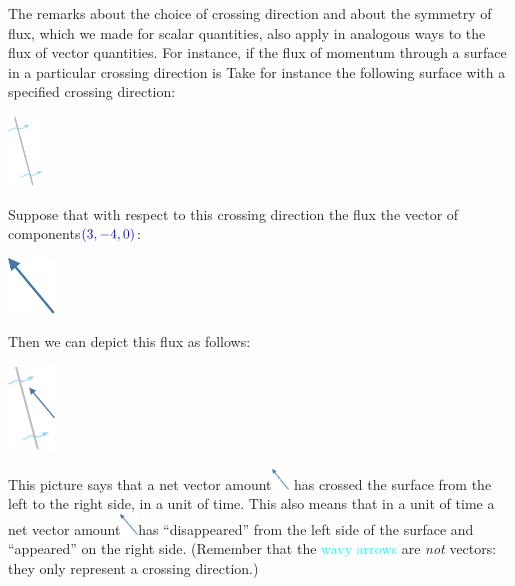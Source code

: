The remarks about the choice of crossing direction and about the symmetry of flux, which we made for scalar quantities, also apply in analogous ways to the flux of vector quantities. For instance, if the flux of momentum through a surface in a particular crossing direction is
Take for instance the following surface with a specified crossing direction:\noprelistbreak
\begin{center}
  \medskip
  \includegraphics[height=5em]{images/surface_tilted_crossright.pdf}
\end{center}
Suppose that with respect to this crossing direction the flux the vector of components\enspace$\mathcolor{blue}{(3, -4, 0)}$:\noprelistbreak
\begin{center}
  \medskip
  \includegraphics[height=4em]{images/vec_NW.pdf}
\end{center}
Then we can depict this flux as follows:\noprelistbreak
\begin{center}
  \medskip
\includegraphics[height=6em]{images/flux_vec_right.pdf}%
\end{center}
This picture says that a net vector amount\enspace\includegraphics[align=c,height=1.5em]{images/vec_NW.pdf}\enspace
has crossed the surface from the left to the right side, in a unit of time. This also means that in a unit of time a net vector amount\enspace\includegraphics[align=c,height=1.5em]{images/vec_NW.pdf}\enspace has \enquote{disappeared} from the left side of the surface and \enquote{appeared} on the right side. (Remember that the \textcolor{cyan}{wavy arrows} are \emph{not} vectors: they only represent a crossing direction.)

